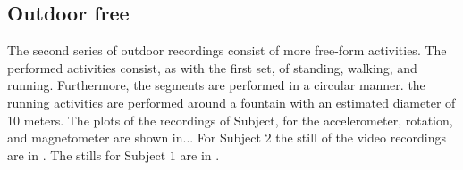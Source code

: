 
\subsection{Outdoor free}\label{subsec:outdoor_free}
The second series of outdoor recordings consist of more free-form activities.
The performed activities consist, as with the first set, of standing, walking, and running.
Furthermore, the segments are performed in a circular manner.
\eg the running activities are performed around a fountain with an estimated diameter of 10 meters.
The plots of the recordings of Subject, for the accelerometer, rotation, and magnetometer are shown in...
For Subject $2$ the still of the video recordings are in .
The stills for Subject $1$ are in .


